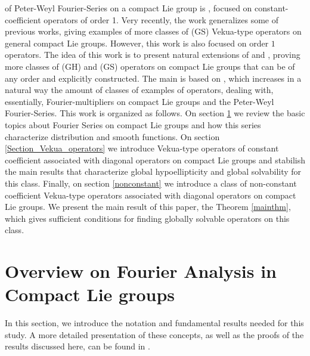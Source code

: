 \documentclass[sn-mathphys-num]{sn-jnl}%
\numberwithin{equation}{section}
\theoremstyle{thmstyleone}
\theoremstyle{thmstyletwo}
\theoremstyle{thmstylethree}
\begin{document}
of Peter-Weyl Fourier-Series on a compact Lie group is \cite{de2022regularity}, focused on constant-coefficient operators of order 1. Very recently, the work \cite{kirilov2026solvability} generalizes some of previous works, giving examples of more classes of (GS) Vekua-type operators on general compact Lie groups. However, this work is also focused on order $1$ operators. The idea of this work is to present natural extensions of \cite{de2022regularity} and \cite{kirilov2026solvability}, proving more classes of (GH) and (GS) operators on compact Lie groups that can be of any order and explicitly constructed. The main is based on \cite{da2025diagonal}, which increases in a natural way the amount of classes of examples of operators, dealing with, essentially, Fourier-multipliers on compact Lie groups and the Peter-Weyl Fourier-Series. This work is organized as follows. On section \ref{overview} we review the basic topics about Fourier Series on compact Lie groups and how this series characterize distribution and smooth functions. On section \ref{Section_Vekua_operators} we introduce Vekua-type operators of constant coefficient associated with diagonal operators on compact Lie groups and stabilish the main results that characterize global hypoellipticity and global solvability for this class. Finally, on section \ref{nonconstant} we introduce a class of non-constant coefficient Vekua-type operators associated with diagonal operators on compact Lie groups. We present the main result of this paper, the Theorem \ref{mainthm}, which gives sufficient conditions for finding globally solvable operators on this class. 
 


\section{Overview on Fourier Analysis in Compact Lie groups}\label{overview}

In this section, we introduce the notation and fundamental results needed for this study. A more detailed presentation of these concepts, as well as the proofs of the results discussed here, can be found in \cite{RT2010_book}.
\end{document}
